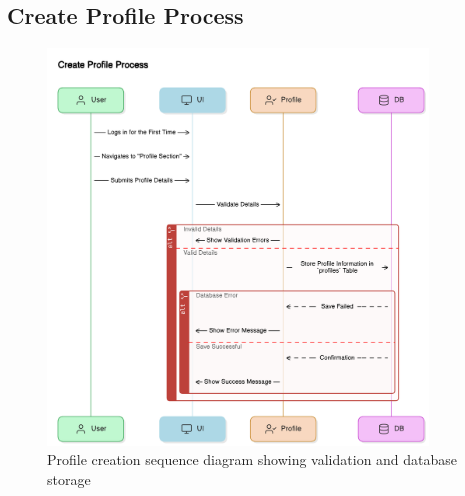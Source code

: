 \subsection{Create Profile Process}
\begin{figure}[H]
    \centering
    \includegraphics[width=0.9\textwidth]{latex-doc/images/sequence_diagrams/create_profile_process.png}
    \caption{Profile creation sequence diagram showing validation and database storage}
    \label{fig:create_profile}
\end{figure}

